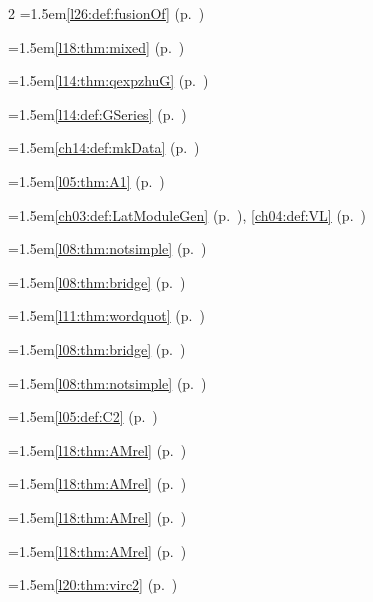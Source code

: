 \begin{multicols}{2}
\hangindent=1.5em\quad \ref{l26:def:fusionOf} (p.~\pageref{l26:def:fusionOf})\par
\hangindent=1.5em\quad \ref{l18:thm:mixed} (p.~\pageref{l18:thm:mixed})\par
\hangindent=1.5em\quad \ref{l14:thm:qexpzhuG} (p.~\pageref{l14:thm:qexpzhuG})\par
\hangindent=1.5em\quad \ref{l14:def:GSeries} (p.~\pageref{l14:def:GSeries})\par
\hangindent=1.5em\quad \ref{ch14:def:mkData} (p.~\pageref{ch14:def:mkData})\par
\hangindent=1.5em\quad \ref{l05:thm:A1} (p.~\pageref{l05:thm:A1})\par
\hangindent=1.5em\quad \ref{ch03:def:LatModuleGen} (p.~\pageref{ch03:def:LatModuleGen}), \ref{ch04:def:VL} (p.~\pageref{ch04:def:VL})\par
\hangindent=1.5em\quad \ref{l08:thm:notsimple} (p.~\pageref{l08:thm:notsimple})\par
\hangindent=1.5em\quad \ref{l08:thm:bridge} (p.~\pageref{l08:thm:bridge})\par
\hangindent=1.5em\quad \ref{l11:thm:wordquot} (p.~\pageref{l11:thm:wordquot})\par
\hangindent=1.5em\quad \ref{l08:thm:bridge} (p.~\pageref{l08:thm:bridge})\par
\hangindent=1.5em\quad \ref{l08:thm:notsimple} (p.~\pageref{l08:thm:notsimple})\par
\hangindent=1.5em\quad \ref{l05:def:C2} (p.~\pageref{l05:def:C2})\par
\hangindent=1.5em\quad \ref{l18:thm:AMrel} (p.~\pageref{l18:thm:AMrel})\par
\hangindent=1.5em\quad \ref{l18:thm:AMrel} (p.~\pageref{l18:thm:AMrel})\par
\hangindent=1.5em\quad \ref{l18:thm:AMrel} (p.~\pageref{l18:thm:AMrel})\par
\hangindent=1.5em\quad \ref{l18:thm:AMrel} (p.~\pageref{l18:thm:AMrel})\par
\hangindent=1.5em\quad \ref{l20:thm:virc2} (p.~\pageref{l20:thm:virc2})\par

\end{multicols}
